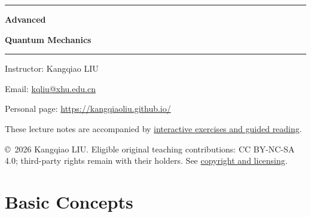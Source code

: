 \documentclass[11pt,a4paper,oneside,openany]{book}
\numberwithin{equation}{section}
\begin{document}
\hypersetup{pageanchor=false}
\begin{titlepage}
  \thispagestyle{empty}
  \centering
  \vspace*{42mm}
  \rule{0.82\textwidth}{0.8pt}\par
  \vspace{16mm}
  {\Huge\bfseries Advanced\par}
  \vspace{3mm}
  {\Huge\bfseries Quantum Mechanics\par}
  \vspace{16mm}
  \rule{0.82\textwidth}{0.8pt}\par
  \vspace{25mm}
  {\large Instructor: Kangqiao LIU\par}
  \vspace{6mm}
  {\normalsize Email: \href{mailto:kqliu@xhu.edu.cn}{kqliu@xhu.edu.cn}\par}
  \vspace{2mm}
  {\normalsize Personal page: \href{https://kangqiaoliu.github.io/}{https://kangqiaoliu.github.io/}\par}
  \vspace{12mm}
  {\small These lecture notes are accompanied by \href{https://kangqiaoliu.github.io/courses/advanced-quantum-mechanics/companion/}{interactive exercises and guided reading}.\par}
  \vspace{5mm}
  {\footnotesize \copyright\ 2026 Kangqiao LIU. Eligible original
  teaching contributions: CC BY-NC-SA 4.0; third-party rights
  remain with their holders. See
  \href{https://github.com/KangqiaoLiu/advanced-quantum-mechanics-lecture-note/blob/main/COPYRIGHT.md}{copyright and licensing}.\par}
  \vfill
  \vspace*{18mm}
\end{titlepage}
\frontmatter
\hypersetup{pageanchor=true}

\tableofcontents
\cleardoublepage



\mainmatter
\chapter{Basic Concepts}







\end{document}
